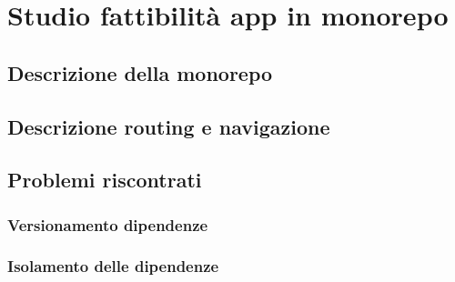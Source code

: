 \chapter{Studio fattibilità app in monorepo}
\label{chap:analisi-requisiti}

\section{Descrizione della monorepo}

\section{Descrizione routing e navigazione}

\section{Problemi riscontrati}

\subsection{Versionamento dipendenze}

\subsection{Isolamento delle dipendenze}


\newpage